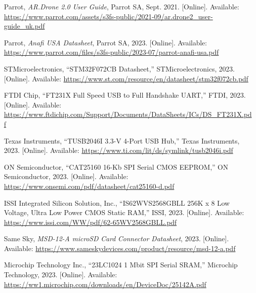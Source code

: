 \documentclass[12pt]{article}
\begin{document}
\clearpage
\begin{thebibliography}{99}

Parrot, \emph{AR.Drone 2.0 User Guide}, Parrot SA, Sept. 2021. [Online]. Available: \url{https://www.parrot.com/assets/s3fs-public/2021-09/ar.drone2_user-guide_uk.pdf}

Parrot, \emph{Anafi USA Datasheet}, Parrot SA, 2023. [Online]. Available: \url{https://www.parrot.com/files/s3fs-public/2023-07/parrot-anafi-usa.pdf}

STMicroelectronics, ``STM32F072CB Datasheet,'' STMicroelectronics, 2023. [Online]. Available: \url{https://www.st.com/resource/en/datasheet/stm32f072cb.pdf}

FTDI Chip, ``FT231X Full Speed USB to Full Handshake UART,'' FTDI, 2023. [Online]. Available: \url{https://www.ftdichip.com/Support/Documents/DataSheets/ICs/DS_FT231X.pdf}

Texas Instruments, ``TUSB2046I 3.3-V 4-Port USB Hub,'' Texas Instruments, 2023. [Online]. Available: \url{https://www.ti.com/lit/ds/symlink/tusb2046i.pdf}

ON Semiconductor, ``CAT25160 16-Kb SPI Serial CMOS EEPROM,'' ON Semiconductor, 2023. [Online]. Available: \url{https://www.onsemi.com/pdf/datasheet/cat25160-d.pdf}

ISSI Integrated Silicon Solution, Inc., ``IS62WVS2568GBLL 256K x 8 Low Voltage, Ultra Low Power CMOS Static RAM,'' ISSI, 2023. [Online]. Available: \url{https://www.issi.com/WW/pdf/62-65WV2568GBLL.pdf}

Same Sky, \emph{MSD-12-A microSD Card Connector Datasheet}, 2023. [Online]. Available: \url{https://www.sameskydevices.com/product/resource/msd-12-a.pdf}

Microchip Technology Inc., ``23LC1024 1 Mbit SPI Serial SRAM,'' Microchip Technology, 2023. [Online]. Available: \url{https://ww1.microchip.com/downloads/en/DeviceDoc/25142A.pdf}


\end{thebibliography}
\end{document}
